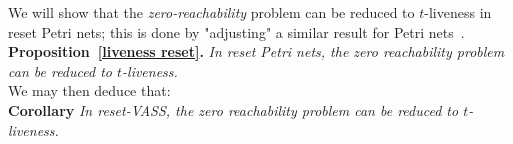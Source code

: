 \documentclass[runningheads]{llncs}
\begin{document}
We will show that the {\em zero-reachability} problem can be reduced to {\sc $t$-liveness} in reset Petri nets; this is done by 
"adjusting" a similar result for Petri nets~\cite[Theorem~5.5]{peterson1981petri}. \\


\noindent
\textbf{Proposition~\ref{liveness reset}.}
{\em In reset Petri nets, the zero reachability problem can be reduced to {\sc $t$-liveness}.}\\

We may then deduce that:\\

\noindent
\textbf{Corollary}
{\em In reset-VASS, the zero reachability problem can be reduced to {\sc $t$-liveness}.}
\end{document}
